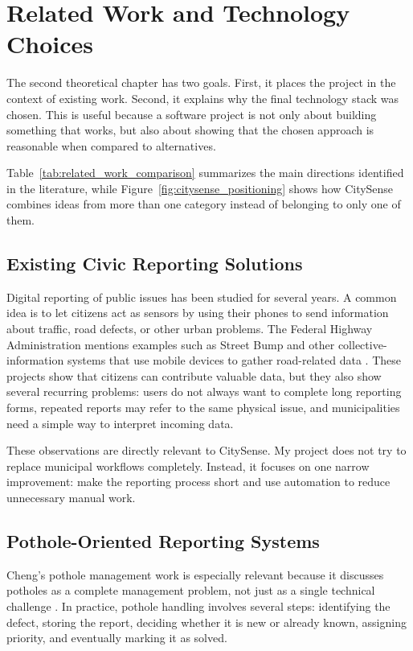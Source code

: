 \chapter{Related Work and Technology Choices}

The second theoretical chapter has two goals. First, it places the project in the context of existing work. Second, it explains why the final technology stack was chosen. This is useful because a software project is not only about building something that works, but also about showing that the chosen approach is reasonable when compared to alternatives.

Table~\ref{tab:related_work_comparison} summarizes the main directions identified in the literature, while Figure~\ref{fig:citysense_positioning} shows how CitySense combines ideas from more than one category instead of belonging to only one of them.

\section{Existing Civic Reporting Solutions}

Digital reporting of public issues has been studied for several years. A common idea is to let citizens act as sensors by using their phones to send information about traffic, road defects, or other urban problems. The Federal Highway Administration mentions examples such as Street Bump and other collective-information systems that use mobile devices to gather road-related data \cite{fhwa2022collective}. These projects show that citizens can contribute valuable data, but they also show several recurring problems: users do not always want to complete long reporting forms, repeated reports may refer to the same physical issue, and municipalities need a simple way to interpret incoming data.

These observations are directly relevant to CitySense. My project does not try to replace municipal workflows completely. Instead, it focuses on one narrow improvement: make the reporting process short and use automation to reduce unnecessary manual work.

\section{Pothole-Oriented Reporting Systems}

Cheng's pothole management work is especially relevant because it discusses potholes as a complete management problem, not just as a single technical challenge \cite{cheng2024potholeprogram}. In practice, pothole handling involves several steps: identifying the defect, storing the report, deciding whether it is new or already known, assigning priority, and eventually marking it as solved.

